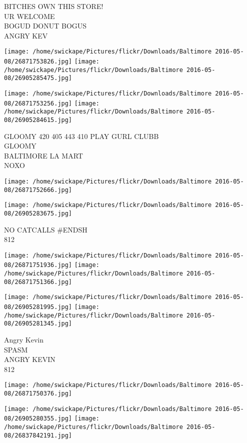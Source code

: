 \documentclass[10pt,letterpaper]{article}
\begin{document}
BITCHES OWN THIS STORE!\\
UR WELCOME\\
BOGUD DONUT BOGUS\\
ANGRY KEV\\
\pagebreak

\texttt{[image: /home/swickape/Pictures/flickr/Downloads/Baltimore 2016-05-08/26871753826.jpg]}
\texttt{[image: /home/swickape/Pictures/flickr/Downloads/Baltimore 2016-05-08/26905285475.jpg]}

\texttt{[image: /home/swickape/Pictures/flickr/Downloads/Baltimore 2016-05-08/26871753256.jpg]}
\texttt{[image: /home/swickape/Pictures/flickr/Downloads/Baltimore 2016-05-08/26905284615.jpg]}

GLOOMY 420 405 443 410 PLAY GURL CLUBB\\
GLOOMY\\
BALTIMORE LA MART\\
NOXO\\
\pagebreak

\texttt{[image: /home/swickape/Pictures/flickr/Downloads/Baltimore 2016-05-08/26871752666.jpg]}

\vspace{0.25in}
\texttt{[image: /home/swickape/Pictures/flickr/Downloads/Baltimore 2016-05-08/26905283675.jpg]}

NO CATCALLS \#ENDSH\\
812\\
\pagebreak

\texttt{[image: /home/swickape/Pictures/flickr/Downloads/Baltimore 2016-05-08/26871751936.jpg]}
\texttt{[image: /home/swickape/Pictures/flickr/Downloads/Baltimore 2016-05-08/26871751366.jpg]}

\texttt{[image: /home/swickape/Pictures/flickr/Downloads/Baltimore 2016-05-08/26905281995.jpg]}
\texttt{[image: /home/swickape/Pictures/flickr/Downloads/Baltimore 2016-05-08/26905281345.jpg]}

Angry Kevin\\
SPASM\\
ANGRY KEVIN\\
812\\
\pagebreak

\texttt{[image: /home/swickape/Pictures/flickr/Downloads/Baltimore 2016-05-08/26871750376.jpg]}

\vspace{0.25in}
\texttt{[image: /home/swickape/Pictures/flickr/Downloads/Baltimore 2016-05-08/26905280355.jpg]}
\texttt{[image: /home/swickape/Pictures/flickr/Downloads/Baltimore 2016-05-08/26837842191.jpg]}
\end{document}
